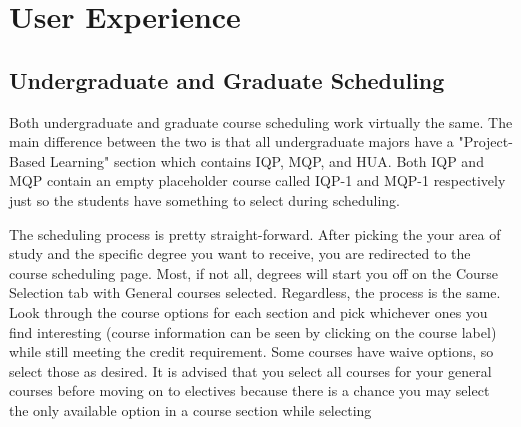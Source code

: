 \documentclass[12pt]{article}
\begin{document}
	\pagebreak
	\section{User Experience}
		\subsection{Undergraduate and Graduate Scheduling}
			Both undergraduate and graduate course scheduling work virtually the same. The main difference between the two is that all undergraduate majors have a "Project-Based Learning" section which contains IQP, MQP, and HUA. Both IQP and MQP contain an empty placeholder course called IQP-1 and MQP-1 respectively just so the students have something to select during scheduling.
			\par
			The scheduling process is pretty straight-forward. After picking the your area of study and the specific degree you want to receive, you are redirected to the course scheduling page. Most, if not all, degrees will start you off on the Course Selection tab with General courses selected. Regardless, the process is the same. Look through the course options for each section and pick whichever ones you find interesting (course information can be seen by clicking on the course label) while still meeting the credit requirement. Some courses have waive options, so select those as desired. It is advised that you select all courses for your general courses before moving on to electives because there is a chance you may select the only available option in a course section while selecting 
\end{document}
